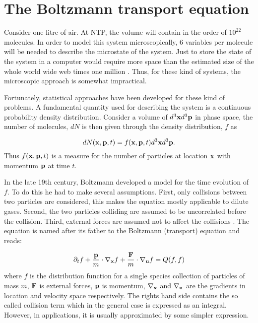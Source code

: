 \section{The Boltzmann transport equation}
Consider one litre of air. At NTP, the volume will contain in the
order of $10^{22}$ molecules. In order to model this system
microscopically, 6 variables per molecule will be needed to describe
the microstate of the system. Just to store the state of the system in
a computer would require more space than the estimated size of the
whole world wide web times one million \cite{wolfram-alpha-web}. Thus,
for these kind of systems, the microscopic approach is somewhat
impractical.

Fortunately, statistical approaches have been developed for these kind
of problems. A fundamental quantity used for describing the system is
a continuous probability density distribution. Consider a volume of
$d^3\mathbf{x} d^3\mathbf{p}$ in phase space, the number of molecules, $dN$ is
then given through the density distribution, $f$ as

\begin{equation}
dN(\mathbf{x}, \mathbf{p}, t) = f(\mathbf{x}, \mathbf{p}, t)d^3\mathbf{x} d^3\mathbf{p}.
\end{equation}
Thus $f(\mathbf{x}, \mathbf{p}, t)$ is a measure for the number of particles at
location $\mathbf{x}$ with momentum $\mathbf{p}$ at time $t$. 

In the late 19th century, Boltzmann developed a model for the time
evolution of $f$. To do this he had to make several
assumptions. First, only collisions between two particles are
considered, this makes the equation mostly applicable to dilute
gases. Second, the two particles colliding are assumed to be
uncorrelated before the collision. Third, external forces are assumed
not to affect the collisions \cite{wolf-gladrow}. The equation is
named after its father to the Boltzmann (transport) equation and reads:

\begin{equation}\label{eq:lbm:boltzmann-eq}
\partial_t f + \frac{\mathbf{p}}{m} \cdot \nabla_{\mathbf{x}}f + \frac{\mathbf{F}}{m} \cdot
\nabla_{\mathbf{u}}f = Q(f, f)
\end{equation}
where $f$ is the distribution function for a single species collection
of particles of mass $m$, $\mathbf{F}$ is external forces, $\mathbf{p}$ is momentum,
$\nabla_{\mathbf{x}}$ and $\nabla_{\mathbf{u}}$ are the gradients in location and
velocity space respectively. The rights hand side contains the so
called collision term which in the general case is expressed as an
integral. However, in applications, it is usually approximated by some
simpler expression.
